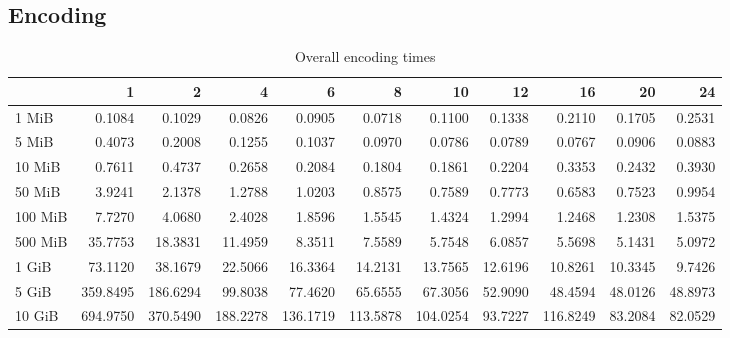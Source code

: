 
\subsection{Encoding}
\begin{table}[!h]
	\caption{Overall encoding times}
	\begin{tabular}{lrrrrrrrrrr}
		\toprule
		\diagbox{File sizes }{Threads} &        1  &        2  &        4  &        6  &        8  &        10 &       12 &        16 &       20 &       24 \\
		\midrule
		1 MiB   &    0.1084 &    0.1029 &    0.0826 &    0.0905 &    0.0718 &    0.1100 &   0.1338 &    0.2110 &   0.1705 &   0.2531 \\
		5 MiB   &    0.4073 &    0.2008 &    0.1255 &    0.1037 &    0.0970 &    0.0786 &   0.0789 &    0.0767 &   0.0906 &   0.0883 \\
		10 MiB  &    0.7611 &    0.4737 &    0.2658 &    0.2084 &    0.1804 &    0.1861 &   0.2204 &    0.3353 &   0.2432 &   0.3930 \\
		50 MiB  &    3.9241 &    2.1378 &    1.2788 &    1.0203 &    0.8575 &    0.7589 &   0.7773 &    0.6583 &   0.7523 &   0.9954 \\
		100 MiB &    7.7270 &    4.0680 &    2.4028 &    1.8596 &    1.5545 &    1.4324 &   1.2994 &    1.2468 &   1.2308 &   1.5375 \\
		500 MiB &   35.7753 &   18.3831 &   11.4959 &    8.3511 &    7.5589 &    5.7548 &   6.0857 &    5.5698 &   5.1431 &   5.0972 \\
		1 GiB   &   73.1120 &   38.1679 &   22.5066 &   16.3364 &   14.2131 &   13.7565 &  12.6196 &   10.8261 &  10.3345 &   9.7426 \\
		5 GiB   &  359.8495 &  186.6294 &   99.8038 &   77.4620 &   65.6555 &   67.3056 &  52.9090 &   48.4594 &  48.0126 &  48.8973 \\
		10 GiB  &  694.9750 &  370.5490 &  188.2278 &  136.1719 &  113.5878 &  104.0254 &  93.7227 &  116.8249 &  83.2084 &  82.0529 \\
		\bottomrule
	\end{tabular}
\end{table}
